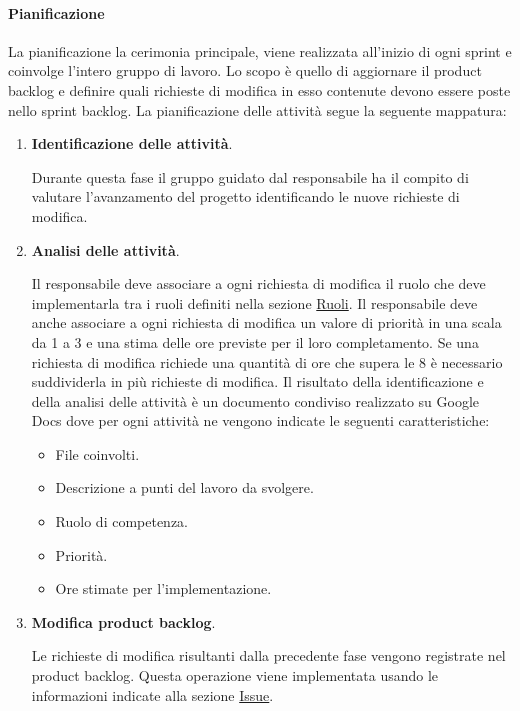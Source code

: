 \paragraph{Pianificazione}
La pianificazione la cerimonia principale, viene realizzata all’inizio di ogni sprint e coinvolge l'intero gruppo di lavoro.
Lo scopo è quello di aggiornare il product backlog e definire quali richieste di modifica in esso contenute devono essere poste nello sprint backlog.
La pianificazione delle attività segue la seguente mappatura:
\begin{enumerate}
    \item \textbf{Identificazione delle attività}.
    
    Durante questa fase il gruppo guidato dal responsabile ha il compito di valutare l’avanzamento del progetto identificando le nuove richieste di modifica.

    \item \textbf{Analisi delle attività}.
    
    Il responsabile deve associare a ogni richiesta di modifica il ruolo che deve implementarla tra i ruoli definiti nella sezione \hyperref[subsubsec:ruoli]{Ruoli}.
    Il responsabile deve anche associare a ogni richiesta di modifica un valore di priorità in una scala da 1 a 3 e una stima delle ore previste per il loro completamento.
    Se una richiesta di modifica richiede una quantità di ore che supera le 8 è necessario suddividerla in più richieste di modifica.
    Il risultato della identificazione e della analisi delle attività è un documento condiviso realizzato su Google Docs dove per ogni attività ne vengono indicate le seguenti caratteristiche:
    \begin{itemize}
        \item File coinvolti.
        \item Descrizione a punti del lavoro da svolgere.
        \item Ruolo di competenza.
        \item Priorità.
        \item Ore stimate per l'implementazione.
    \end{itemize}

    \item \textbf{Modifica product backlog}.
    
    Le richieste di modifica risultanti dalla precedente fase vengono registrate nel product backlog.
    Questa operazione viene implementata usando le informazioni indicate alla sezione \hyperref[subpar:ITS]{Issue}.


\end{enumerate}
